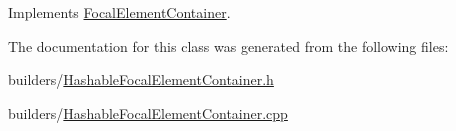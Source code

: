 Implements \hyperlink{classFocalElementContainer_a444a088fc937650226f2ecdd1db59510}{Focal\+Element\+Container}.



The documentation for this class was generated from the following files\+:\begin{DoxyCompactItemize}
\item 
builders/\hyperlink{HashableFocalElementContainer_8h}{Hashable\+Focal\+Element\+Container.\+h}\item 
builders/\hyperlink{HashableFocalElementContainer_8cpp}{Hashable\+Focal\+Element\+Container.\+cpp}\end{DoxyCompactItemize}
